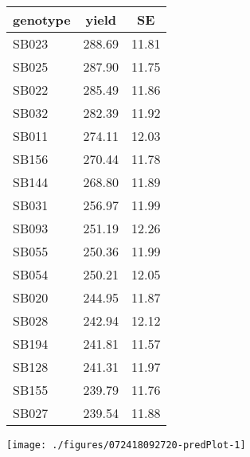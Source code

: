 \documentclass[a4paper,11pt]{article}\usepackage[]{graphicx}\usepackage[]{color}
\newenvironment{knitrout}{}{} %
\begin{document}
\begin{multicols*}{2}
\begin{tabular}{lcc}
  \hline
genotype & yield & SE \\ 
  \hline
SB023 & 288.69 & 11.81 \\ 
  SB025 & 287.90 & 11.75 \\ 
  SB022 & 285.49 & 11.86 \\ 
  SB032 & 282.39 & 11.92 \\ 
  SB011 & 274.11 & 12.03 \\ 
  SB156 & 270.44 & 11.78 \\ 
  SB144 & 268.80 & 11.89 \\ 
  SB031 & 256.97 & 11.99 \\ 
  SB093 & 251.19 & 12.26 \\ 
  SB055 & 250.36 & 11.99 \\ 
  SB054 & 250.21 & 12.05 \\ 
  SB020 & 244.95 & 11.87 \\ 
  SB028 & 242.94 & 12.12 \\ 
  SB194 & 241.81 & 11.57 \\ 
  SB128 & 241.31 & 11.97 \\ 
  SB155 & 239.79 & 11.76 \\ 
  SB027 & 239.54 & 11.88 \\ 
   \hline
\end{tabular}

\columnbreak
\begin{knitrout}
\color{fgcolor}
\texttt{[image: ./figures/072418092720-predPlot-1]} 

\end{knitrout}
\end{multicols*}
\end{document}

